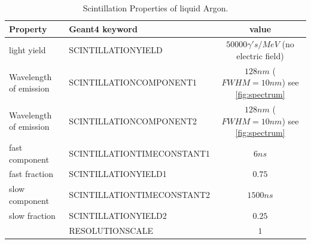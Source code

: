 \documentclass{article}
\begin{document}
  \begin{table}[h!]
  \begin{center}
    \label{tab:table1}
    \begin{tabular}{|l|l|c|} %
      \hline
      \textbf{Property}& \textbf{Geant4 keyword} &       \textbf{value}\\
      \hline
      light yield&SCINTILLATIONYIELD & $50000 \gamma 's/MeV$ (no electric field)\\
      Wavelength of emission&SCINTILLATIONCOMPONENT1 &  $128nm$ ($FWHM=10nm$) see \ref{fig:spectrum}\\
      Wavelength of emission&SCINTILLATIONCOMPONENT2 &  $128nm$ ($FWHM=10nm$)  see \ref{fig:spectrum}\\
      fast component&SCINTILLATIONTIMECONSTANT1& $6 ns$\\  
      fast fraction&SCINTILLATIONYIELD1& $0.75$ \\
      slow component&SCINTILLATIONTIMECONSTANT2& $1500 ns$ \\
      slow fraction&SCINTILLATIONYIELD2& $0.25$\\
                   &RESOLUTIONSCALE& $1$\\
      \hline
    \end{tabular}
  \end{center}
  \caption{Scintillation Properties of liquid Argon.}
  \end{table}
\end{document}
